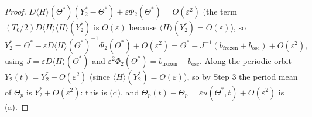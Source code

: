 \begin{proof}
$D\langle H\rangle(\Theta^*)(Y_2^* - \Theta^*) + \varepsilon\Phi_2(\Theta^*) = O(\varepsilon^2)$ (the term
$(T_0/2)D\langle H\rangle\langle H\rangle(Y_2^*)$ is $O(\varepsilon)$ because $\langle H\rangle(Y_2^*) = O(\varepsilon)$),
so
\[
  Y_2^* = \Theta^* - \varepsilon D\langle H\rangle(\Theta^*)^{-1}\Phi_2(\Theta^*) + O(\varepsilon^2)
  = \Theta^* - J^{-1}(b_{\mathrm{frozen}} + b_{\mathrm{osc}}) + O(\varepsilon^2),
\]
using $J = \varepsilon D\langle H\rangle(\Theta^*)$ and $\varepsilon^2\Phi_2(\Theta^*) = b_{\mathrm{frozen}} + b_{\mathrm{osc}}$.
Along the periodic orbit $Y_2(t) = Y_2^* + O(\varepsilon^2)$ (since $\langle H\rangle(Y_2^*) = O(\varepsilon)$), so by
Step 3 the period mean of $\Theta_p$ is $Y_2^* + O(\varepsilon^2)$: this is \textup{(d)}, and
$\Theta_p(t) - \bar\Theta_p = \varepsilon u(\Theta^*,t) + O(\varepsilon^2)$ is \textup{(a)}.


\end{proof}
